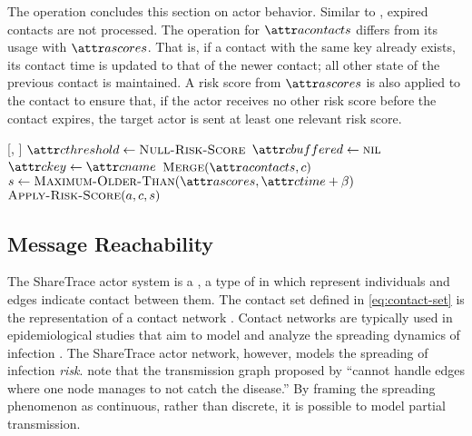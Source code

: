 The \cHandleContact operation concludes this section on actor behavior. Similar to \cHandleRiskScore, expired contacts are not processed. The \cMerge operation for $\aActorContacts$ differs from its usage with $\aActorScores$. That is, if a contact with the same key already exists, its contact time is updated to that of the newer contact; all other state of the previous contact is maintained. A risk score from $\aActorScores$ is also applied to the contact to ensure that, if the actor receives no other risk score before the contact expires, the target actor is sent at least one relevant risk score.

\begin{function}{\nHandleContact}[\vActor, \vContact]
    \State $\aContactThreshold \assign \cNullRiskScore$
    \State $\aContactBuffered \assign \nil$
    \State $\aContactKey \assign \aContactName$
    \State $\cMerge[\aActorContacts, \vContact]$
    \State $\vScore \assign \cMaximumOlderThan[\aActorScores, \aContactTime + \pTimeBuffer]$
    \State $\cApplyRiskScore[\vActor, \vContact, \vScore]$
  \EndIf
\end{function}

\subsection{Message Reachability}\label{sec:reachability}

The ShareTrace actor system is a , a type of  in which \verticesName represent individuals and edges indicate contact between them. The contact set defined in \cref{eq:contact-set} is the  representation of a contact network \citep{Holme2012}. Contact networks are typically used in epidemiological studies that aim to model and analyze the spreading dynamics of infection \citep{Riolo2001, Danon2011, Lokhov2014, Craft2015, Pastor-Satorras2015, Koher2019, Zino2021}. The ShareTrace actor network, however, models the spreading of infection \emph{risk}. \citet{Holme2012} note that the transmission graph proposed by \citet{Riolo2001} ``cannot handle edges where one node manages to not catch the disease.'' By framing the spreading phenomenon as continuous, rather than discrete, it is possible to model partial transmission.

